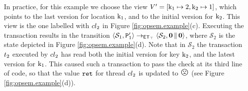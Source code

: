 In practice, for this example we choose the view $V' = [ \mathrm{k}_1 \mapsto 2, \mathrm{k}_2 \mapsto 1]$, 
which points to the last version for location $\mathrm{k}_1$, and to the initial version for $\mathrm{k}_2$. 
This view is the one labelled with $cl_2$ in Figure \ref{fig:opsem.example}(c). Executing the transaction 
results in the transition $\langle \mathcal{S}_1, \texttt{P}_1' \rangle \rightarrow_{\mathsf{ET}_{\top}} \langle \mathcal{S}_2, \mathbf{0} \mathop{\lVert} \mathbf{0} \rangle$, 
where $\mathcal{S}_2$ is the state depicted in Figure \ref{fig:opsem.example}(d). 
Note that in $\mathcal{S}_2$ the transaction $t_2$ executed by $cl_2$ has 
read both the initial version for key $\mathrm{k}_2$, and the latest version for $\mathrm{k}_1$. 
This caused such a transaction to pass the check at its third line of code, so that the value $\texttt{ret}$ 
for thread $cl_2$ is updated to ${\Large \frownie{}}$ (see Figure \ref{fig:opsem.example}(d)).

